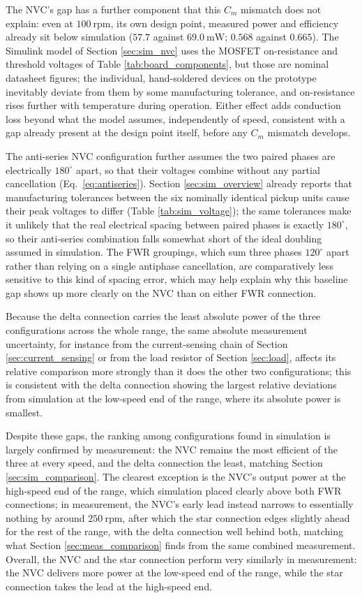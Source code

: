 The NVC's gap has a further component that this $C_m$ mismatch does not explain: even at $100\ \text{rpm}$, its own design point, measured power and efficiency already sit below simulation ($57.7$ against $69.0\ \text{mW}$; $0.568$ against $0.665$). The Simulink model of Section \ref{sec:sim_nvc} uses the MOSFET on-resistance and threshold voltages of Table \ref{tab:board_components}, but those are nominal datasheet figures; the individual, hand-soldered devices on the prototype inevitably deviate from them by some manufacturing tolerance, and on-resistance rises further with temperature during operation. Either effect adds conduction loss beyond what the model assumes, independently of speed, consistent with a gap already present at the design point itself, before any $C_m$ mismatch develops.

The anti-series NVC configuration further assumes the two paired phases are electrically $180^\circ$ apart, so that their voltages combine without any partial cancellation (Eq.~\eqref{eq:antiseries}). Section \ref{sec:sim_overview} already reports that manufacturing tolerances between the six nominally identical pickup units cause their peak voltages to differ (Table \ref{tab:sim_voltage}); the same tolerances make it unlikely that the real electrical spacing between paired phases is exactly $180^\circ$, so their anti-series combination falls somewhat short of the ideal doubling assumed in simulation. The FWR groupings, which sum three phases $120^\circ$ apart rather than relying on a single antiphase cancellation, are comparatively less sensitive to this kind of spacing error, which may help explain why this baseline gap shows up more clearly on the NVC than on either FWR connection.

Because the delta connection carries the least absolute power of the three configurations across the whole range, the same absolute measurement uncertainty, for instance from the current-sensing chain of Section \ref{sec:current_sensing} or from the load resistor of Section \ref{sec:load}, affects its relative comparison more strongly than it does the other two configurations; this is consistent with the delta connection showing the largest relative deviations from simulation at the low-speed end of the range, where its absolute power is smallest.

Despite these gaps, the ranking among configurations found in simulation is largely confirmed by measurement: the NVC remains the most efficient of the three at every speed, and the delta connection the least, matching Section \ref{sec:sim_comparison}. The clearest exception is the NVC's output power at the high-speed end of the range, which simulation placed clearly above both FWR connections; in measurement, the NVC's early lead instead narrows to essentially nothing by around $250\ \text{rpm}$, after which the star connection edges slightly ahead for the rest of the range, with the delta connection well behind both, matching what Section \ref{sec:meas_comparison} finds from the same combined measurement. Overall, the NVC and the star connection perform very similarly in measurement: the NVC delivers more power at the low-speed end of the range, while the star connection takes the lead at the high-speed end.
